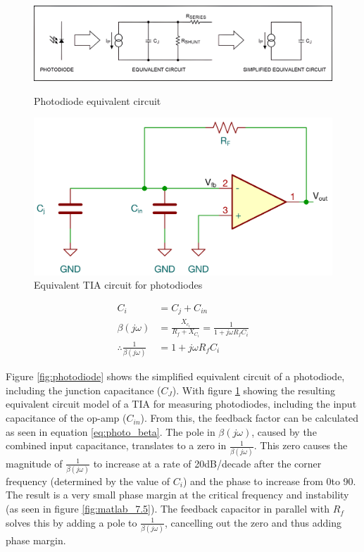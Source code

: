 \begin{figure}[H]
    \centering
    \begin{minipage}{0.6\textwidth}
        \centering
        \includegraphics[width=\textwidth]{PhotoDiodeCircuit.png}
        \caption{Photodiode equivalent circuit\cite{StabilizeYourTransimpedance}}
        \label{fig:photodiode}
    \end{minipage}\hfill
    \begin{minipage}{0.4\textwidth}
        \centering
        \includegraphics[width=\textwidth]{PhotoTIA.png}
        \caption{Equivalent TIA circuit for photodiodes}
        \label{fig:tia_photo}
    \end{minipage}
\end{figure}

\begin{align}
    C_i &= C_j+C_{in} \\
    \beta (j\omega) &= \frac{X_{c_i}}{R_f + X_{C_i}} = \frac{1}{1+j\omega R_fC_i} \label{eq:photo_beta}\\
    \therefore \frac{1}{\beta(j\omega)} &= 1+j\omega R_fC_i
\end{align}

Figure \ref{fig:photodiode} shows the simplified equivalent circuit of a photodiode, including the junction capacitance ($C_J$). With figure \ref{fig:tia_photo} showing the resulting equivalent circuit model of a TIA for measuring photodiodes, including the input capacitance of the op-amp ($C_{in}$). From this, the feedback factor can be calculated as seen in equation \ref{eq:photo_beta}. The pole in $\beta(j\omega)$, caused by the combined input capacitance, translates to a zero in $\frac{1}{\beta(j\omega)}$. This zero causes the magnitude of $\frac{1}{\beta(j\omega)}$ to increase at a rate of 20dB/decade after the corner frequency (determined by the value of $C_{i}$) and the phase to increase from 0\textdegree to 90\textdegree. The result is a very small phase margin at the critical frequency and instability (as seen in figure \ref{fig:matlab_7.5}). The feedback capacitor in parallel with $R_f$ solves this by adding a pole to $\frac{1}{\beta(j\omega)}$, cancelling out the zero and thus adding phase margin.

